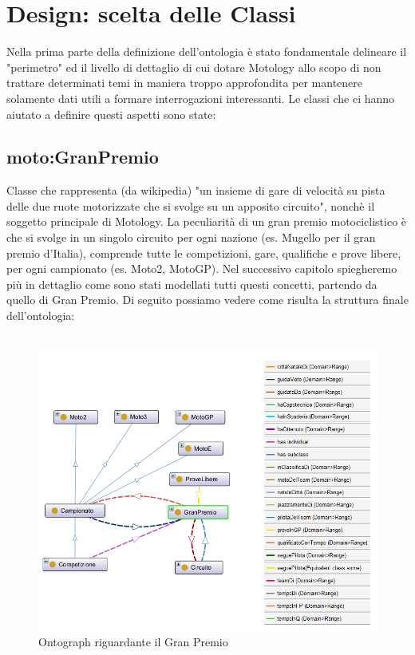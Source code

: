 \newpage

\section{Design: scelta delle Classi}
Nella prima parte della definizione dell'ontologia è stato fondamentale delineare il "perimetro" ed il livello di dettaglio di cui dotare Motology allo scopo di non trattare determinati temi in maniera troppo approfondita per mantenere solamente dati utili a formare interrogazioni interessanti. Le classi che ci hanno aiutato a definire questi aspetti sono state:

\subsection{moto:GranPremio}
Classe che rappresenta (da wikipedia) "un insieme di gare di velocità su pista delle due ruote motorizzate che si svolge su un apposito circuito", nonchè il soggetto principale di Motology. La peculiarità di un gran premio motociclistico è che si svolge in un singolo circuito per ogni nazione (es. Mugello per il gran premio d'Italia), comprende tutte le competizioni, gare, qualifiche e prove libere, per ogni campionato (es. Moto2, MotoGP). Nel successivo capitolo spiegheremo più in dettaglio come sono stati modellati tutti questi concetti, partendo da quello di Gran Premio. Di seguito possiamo vedere come risulta la struttura finale dell'ontologia:
\\\\
\begin{figure}[H]
    \begin{center}
        \includegraphics[scale=0.9]{img/gran premio.png}
       \caption{Ontograph riguardante il Gran Premio} 
    \end{center}
\end{figure}

